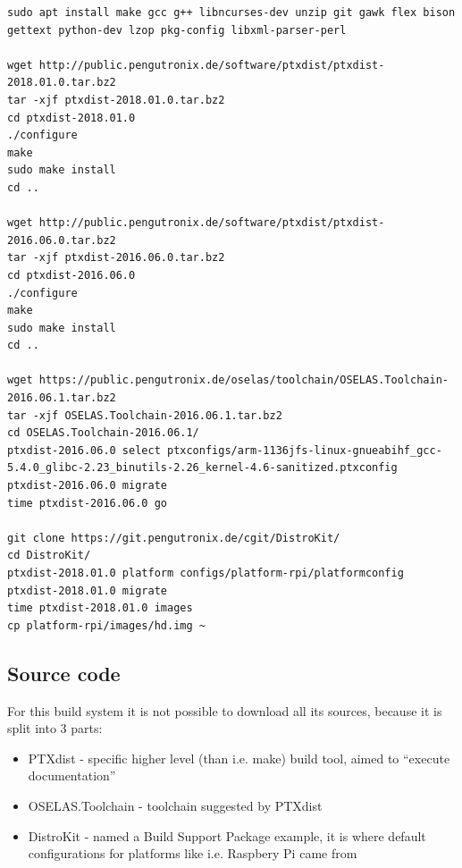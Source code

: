 \documentclass[printmode]{mgr}
\begin{document}
\begin{lstlisting}
sudo apt install make gcc g++ libncurses-dev unzip git gawk flex bison gettext python-dev lzop pkg-config libxml-parser-perl

wget http://public.pengutronix.de/software/ptxdist/ptxdist-2018.01.0.tar.bz2
tar -xjf ptxdist-2018.01.0.tar.bz2
cd ptxdist-2018.01.0
./configure
make
sudo make install
cd ..

wget http://public.pengutronix.de/software/ptxdist/ptxdist-2016.06.0.tar.bz2
tar -xjf ptxdist-2016.06.0.tar.bz2
cd ptxdist-2016.06.0
./configure
make
sudo make install
cd ..

wget https://public.pengutronix.de/oselas/toolchain/OSELAS.Toolchain-2016.06.1.tar.bz2
tar -xjf OSELAS.Toolchain-2016.06.1.tar.bz2
cd OSELAS.Toolchain-2016.06.1/
ptxdist-2016.06.0 select ptxconfigs/arm-1136jfs-linux-gnueabihf_gcc-5.4.0_glibc-2.23_binutils-2.26_kernel-4.6-sanitized.ptxconfig
ptxdist-2016.06.0 migrate
time ptxdist-2016.06.0 go

git clone https://git.pengutronix.de/cgit/DistroKit/
cd DistroKit/
ptxdist-2018.01.0 platform configs/platform-rpi/platformconfig
ptxdist-2018.01.0 migrate
time ptxdist-2018.01.0 images
cp platform-rpi/images/hd.img ~
\end{lstlisting}




\subsection*{Source code}

For this build system it is not possible to download all its sources, because it is split into 3 parts:

\begin{itemize}
    \item PTXdist - specific higher level (than i.e. make) build tool, aimed to ``execute documentation''
    \item OSELAS.Toolchain - toolchain suggested by PTXdist
    \item DistroKit - named a Build Support Package example, it is where default configurations for platforms like i.e. Raspbery Pi came from
\end{itemize}
\end{document}
